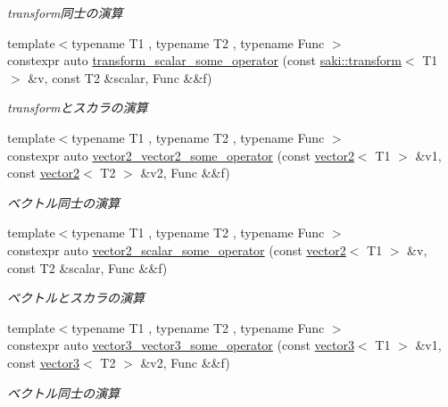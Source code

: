 \begin{DoxyCompactItemize}
\begin{DoxyCompactList}\small\item\em transform同士の演算 \end{DoxyCompactList}\item 
{\footnotesize template$<$typename T1 , typename T2 , typename Func $>$ }\\constexpr auto \mbox{\hyperlink{namespacesaki_1_1details_a28e351f8fafd551dda6ba3cb32e6d0af}{transform\+\_\+scalar\+\_\+some\+\_\+operator}} (const \mbox{\hyperlink{classsaki_1_1transform}{saki\+::transform}}$<$ T1 $>$ \&v, const T2 \&scalar, Func \&\&f)
\begin{DoxyCompactList}\small\item\em transformとスカラの演算 \end{DoxyCompactList}\item 
{\footnotesize template$<$typename T1 , typename T2 , typename Func $>$ }\\constexpr auto \mbox{\hyperlink{namespacesaki_1_1details_a83d5020a51b57f3b8f8166e785861cc5}{vector2\+\_\+vector2\+\_\+some\+\_\+operator}} (const \mbox{\hyperlink{classsaki_1_1vector2}{vector2}}$<$ T1 $>$ \&v1, const \mbox{\hyperlink{classsaki_1_1vector2}{vector2}}$<$ T2 $>$ \&v2, Func \&\&f)
\begin{DoxyCompactList}\small\item\em ベクトル同士の演算 \end{DoxyCompactList}\item 
{\footnotesize template$<$typename T1 , typename T2 , typename Func $>$ }\\constexpr auto \mbox{\hyperlink{namespacesaki_1_1details_a02e93149670af3f28e74fcb7dbcf4fa9}{vector2\+\_\+scalar\+\_\+some\+\_\+operator}} (const \mbox{\hyperlink{classsaki_1_1vector2}{vector2}}$<$ T1 $>$ \&v, const T2 \&scalar, Func \&\&f)
\begin{DoxyCompactList}\small\item\em ベクトルとスカラの演算 \end{DoxyCompactList}\item 
{\footnotesize template$<$typename T1 , typename T2 , typename Func $>$ }\\constexpr auto \mbox{\hyperlink{namespacesaki_1_1details_a2febe2ef2ca8b6222cd2edd5c82863ad}{vector3\+\_\+vector3\+\_\+some\+\_\+operator}} (const \mbox{\hyperlink{classsaki_1_1vector3}{vector3}}$<$ T1 $>$ \&v1, const \mbox{\hyperlink{classsaki_1_1vector3}{vector3}}$<$ T2 $>$ \&v2, Func \&\&f)
\begin{DoxyCompactList}\small\item\em ベクトル同士の演算 \end{DoxyCompactList}\item 

\end{DoxyCompactItemize}
